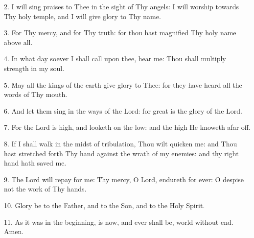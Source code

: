 2. I will sing praises to Thee in the sight of Thy angels: I will worship towards Thy holy temple, and I will give glory to Thy name.
	 
3. For Thy mercy, and for Thy truth: for thou hast magnified Thy holy name above all.
 
4.  In what day soever I shall call upon thee, hear me: Thou shall multiply strength in my soul.

5. May all the kings of the earth give glory to Thee: for they have heard all the words of Thy mouth.
 
6. And let them sing in the ways of the Lord: for great is the glory of the Lord.
 
7. For the Lord is high, and looketh on the low: and the high He knoweth afar off.

8. If I shall walk in the midst of tribulation, Thou wilt quicken me: and Thou hast stretched forth Thy hand against the wrath of my enemies: and thy right hand hath saved me.
	 
 9. The Lord will repay for me: Thy mercy, O Lord, endureth for ever: O despise not the work of Thy hands.

10. Glory be to the Father, and to the Son, and to the Holy Spirit.

11. As it was in the beginning, is now, and ever shall be, world without end. Amen.